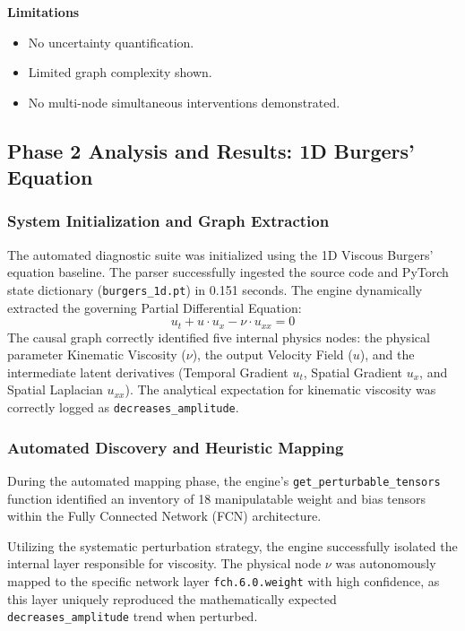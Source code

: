 \documentclass[12pt,singleside,a4paper]{article}
\begin{document}
\textbf{Limitations}
\begin{itemize}
    \item No uncertainty quantification.
    \item Limited graph complexity shown.
    \item No multi-node simultaneous interventions demonstrated.
\end{itemize}

\subsection{Phase 2 Analysis and Results: 1D Burgers' Equation}

\subsubsection{System Initialization and Graph Extraction}
The automated diagnostic suite was initialized using the 1D Viscous Burgers' equation baseline. The parser successfully ingested the source code and PyTorch state dictionary (\texttt{burgers\_1d.pt}) in 0.151 seconds. The engine dynamically extracted the governing Partial Differential Equation:
\begin{equation}
u_t + u \cdot u_x - \nu \cdot u_{xx} = 0
\end{equation}
The causal graph correctly identified five internal physics nodes: the physical parameter Kinematic Viscosity ($\nu$), the output Velocity Field ($u$), and the intermediate latent derivatives (Temporal Gradient $u_t$, Spatial Gradient $u_x$, and Spatial Laplacian $u_{xx}$). The analytical expectation for kinematic viscosity was correctly logged as \texttt{decreases\_amplitude}.

\subsubsection{Automated Discovery and Heuristic Mapping}
During the automated mapping phase, the engine's \texttt{get\_perturbable\_tensors} function identified an inventory of 18 manipulatable weight and bias tensors within the Fully Connected Network (FCN) architecture. 

Utilizing the systematic perturbation strategy, the engine successfully isolated the internal layer responsible for viscosity. The physical node $\nu$ was autonomously mapped to the specific network layer \texttt{fch.6.0.weight} with high confidence, as this layer uniquely reproduced the mathematically expected \texttt{decreases\_amplitude} trend when perturbed. 
\end{document}
